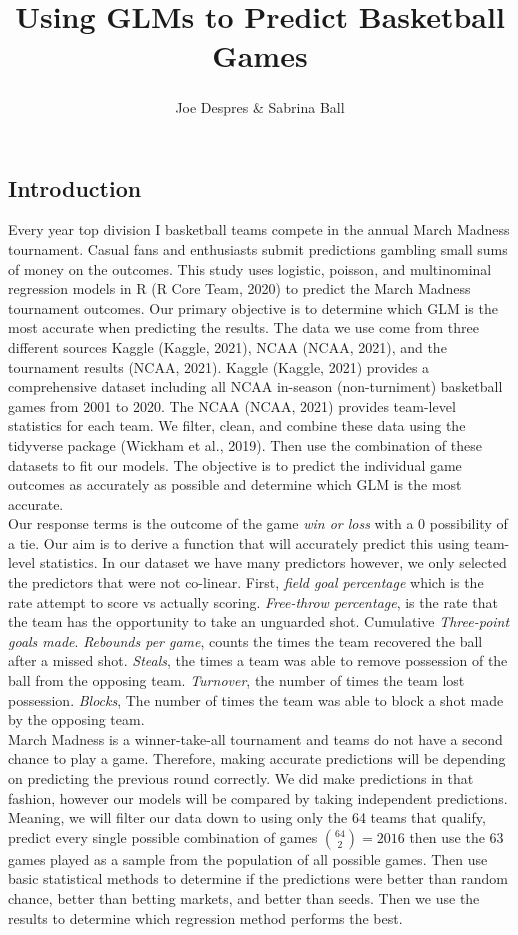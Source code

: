 \documentclass[
  man,floatsintext]{apa6}
\title{Using GLMs to Predict Basketball Games}
\author{Joe Despres\textsuperscript{} \& Sabrina Ball\textsuperscript{}}
\date{}
\affiliation{\vspace{0.5cm}\textsuperscript{} Michigan State University}
\begin{document}
\maketitle

\hypertarget{introduction}{%
\subsection{Introduction}\label{introduction}}

Every year top division I basketball teams compete in the annual March Madness tournament. Casual fans and enthusiasts submit predictions gambling small sums of money on the outcomes. This study uses logistic, poisson, and multinominal regression models in R (R Core Team, 2020) to predict the March Madness tournament outcomes. Our primary objective is to determine which GLM is the most accurate when predicting the results. The data we use come from three different sources Kaggle (Kaggle, 2021), NCAA (NCAA, 2021), and the tournament results (NCAA, 2021). Kaggle (Kaggle, 2021) provides a comprehensive dataset including all NCAA in-season (non-turniment) basketball games from 2001 to 2020. The NCAA (NCAA, 2021) provides team-level statistics for each team. We filter, clean, and combine these data using the tidyverse package (Wickham et al., 2019). Then use the combination of these datasets to fit our models. The objective is to predict the individual game outcomes as accurately as possible and determine which GLM is the most accurate.\\
Our response terms is the outcome of the game \emph{win or loss} with a 0 possibility of a tie. Our aim is to derive a function that will accurately predict this using team-level statistics. In our dataset we have many predictors however, we only selected the predictors that were not co-linear. First, \emph{field goal percentage} which is the rate attempt to score vs actually scoring. \emph{Free-throw percentage}, is the rate that the team has the opportunity to take an unguarded shot. Cumulative \emph{Three-point goals made}. \emph{Rebounds per game}, counts the times the team recovered the ball after a missed shot. \emph{Steals}, the times a team was able to remove possession of the ball from the opposing team. \emph{Turnover}, the number of times the team lost possession. \emph{Blocks}, The number of times the team was able to block a shot made by the opposing team.\\
March Madness is a winner-take-all tournament and teams do not have a second chance to play a game. Therefore, making accurate predictions will be depending on predicting the previous round correctly. We did make predictions in that fashion, however our models will be compared by taking independent predictions. Meaning, we will filter our data down to using only the 64 teams that qualify, predict every single possible combination of games \({64\choose 2} = 2016\) then use the 63 games played as a sample from the population of all possible games. Then use basic statistical methods to determine if the predictions were better than random chance, better than betting markets, and better than seeds. Then we use the results to determine which regression method performs the best.\\
\end{document}
